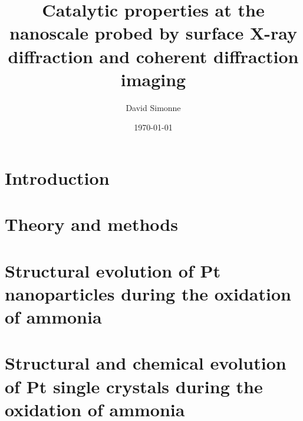 \documentclass[11pt]{report}
\title{Catalytic properties at the nanoscale probed by surface X-ray diffraction and coherent diffraction imaging}
\author{David Simonne}
\date{\today}
\begin{document}
    


\frontmatter
{\hypersetup{linkcolor=black}
    \tableofcontents
    \listoffigures
    \listoftables
}

\mainmatter
    \chapter{Introduction}
    
     
    \chapter{Theory and methods}
    
    
    
    
    
    
    
    \chapter{Structural evolution of Pt nanoparticles during the oxidation of ammonia}
    
    
    
    
    

    \chapter{Structural and chemical evolution of Pt single crystals during the oxidation of ammonia}
    
    
    
    
\end{document}
